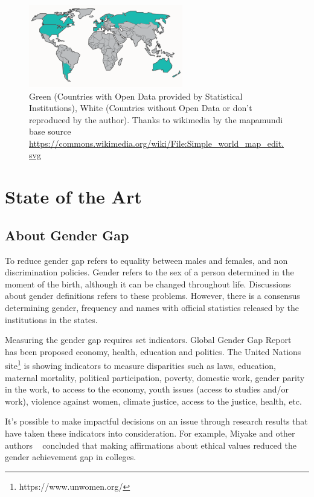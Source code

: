 \documentclass[a4paper]{article}
\begin{document}
\begin{figure}
  \centering
  \includegraphics[width=0.6\textwidth]{images/Simple_world_map_edit.pdf}
  \caption[Caption for LOF]{Green (Countries with Open Data provided by Statistical Institutions), White (Countries without Open Data or don't reproduced by the author). Thanks to wikimedia by the mapamundi base source \url{https://commons.wikimedia.org/wiki/File:Simple_world_map_edit.svg}}
  \label{fig:mapamundi}
\end{figure}

\section{State of the Art}
\label{sec:stateofart}

\subsection{About Gender Gap}

To reduce gender gap refers to equality between males and females,
and non discrimination policies. Gender refers to the sex of a person
determined in the moment of the birth, although it can be changed
throughout life. Discussions about gender definitions refers to these
problems. However, there is a consensus determining gender, frequency
and names with official statistics released by the institutions in the
states.

Measuring the gender gap requires set indicators. Global Gender Gap
Report~\cite{chancel2022world} has been proposed economy, health,
education and politics. The United Nations
site\footnote{https://www.unwomen.org/} is showing indicators
to measure disparities such as laws, education, maternal mortality,
political participation, poverty, domestic work, gender parity in
the work, to access to the economy, youth issues (access to
studies and/or work), violence against women, climate justice,
access to the justice, health, etc.

It's possible to make impactful decisions on an issue through research
results that have taken these indicators into consideration. For example,
Miyake and other authors ~\cite{miyake2010reducing} concluded that making
affirmations about ethical values reduced the gender achievement gap in colleges.
\end{document}
